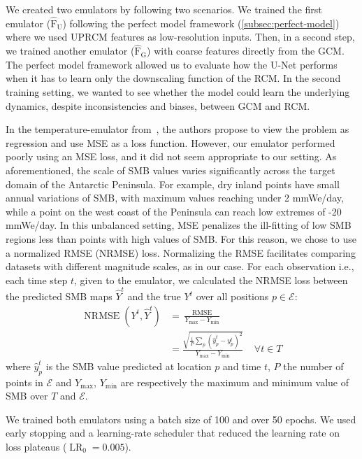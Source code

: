 \documentclass[a4paper,11pt,oneside]{report}
\begin{document}
We created two emulators by following two scenarios. We trained the first emulator ($\mathrm{\hat{F}_U}$) following the perfect model framework (\autoref{subsec:perfect-model}) where we used UPRCM features as low-resolution inputs. Then, in a second step, we trained another emulator ($\mathrm{\hat{F}_G}$) with coarse features directly from the GCM. The perfect model framework allowed us to evaluate how the U-Net performs when it has to learn only the downscaling function of the RCM. In the second training setting, we wanted to see whether the model could learn the underlying dynamics, despite inconsistencies and biases, between GCM and RCM. 


In the temperature-emulator from~\cite{Doury}, the authors propose to view the problem as regression and use MSE as a loss function. However, our emulator performed poorly using an MSE loss, and it did not seem appropriate to our setting. As aforementioned, the scale of SMB values varies significantly across the target domain of the Antarctic Peninsula. For example, dry inland points have small annual variations of SMB, with maximum values reaching under 2 \si{mmWe/day}, while a point on the west coast of the Peninsula can reach low extremes of -20 \si{mmWe/day}. In this unbalanced setting, MSE penalizes the ill-fitting of low SMB regions less than points with high values of SMB. For this reason, we chose to use a normalized RMSE (NRMSE) loss. Normalizing the RMSE facilitates comparing datasets with different magnitude scales, as in our case. For each observation i.e., each time step $t$, given to the emulator, we calculated the NRMSE loss between the predicted SMB maps $\hat{Y}^{t}$ and the true $Y^{t}$ over all positions $p \in \mathcal{E}$:
\begin{align*}
        \operatorname{NRMSE}\left(Y^{t},\hat{Y}^{t}\right) &= \frac{\operatorname{RMSE}}{Y_{\max} - Y_{\min}} \\
         &=\frac{\sqrt{\frac{1}{P}\sum_{p}(\hat{y}_{p}^{t}-y^{t}_{p})^2}}{Y_{\max} - Y_{\min}}   \;\;\;\; \forall t \in T
\end{align*}
where $\hat{y}_{p}^{t}$ is the SMB value predicted at location $p$ and time $t$, $P$ the number of points in $\mathcal{E}$ and $Y_{\max}$, $Y_{\min}$ are respectively the maximum and minimum value of SMB over $T$ and $\mathcal{E}$.

We trained both emulators using a batch size of 100 and over 50 epochs. We used early stopping and a learning-rate scheduler that reduced the learning rate on loss plateaus ($\operatorname{LR}_0 = 0.005$). 
\end{document}
